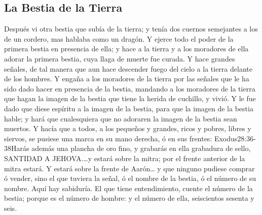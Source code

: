 \subsection*{La Bestia de la Tierra}
Después vi otra bestia que subía de la tierra; y tenía dos cuernos%
 semejantes a los de un cordero, mas hablaba como un dragón. 
Y ejerce todo el poder de la primera bestia en presencia de ella; y hace a la tierra y a los moradores de ella adorar la primera bestia, cuya llaga de muerte fue curada. 
Y hace grandes señales, de tal manera que aun hace descender fuego del cielo a la tierra delante de los hombres.%
Y engaña a los moradores de la tierra por las señales que le ha sido dado hacer en presencia de la bestia, mandando a los moradores de la tierra que hagan la imagen de la bestia que tiene la herida de cuchillo, y vivió. 
Y le fue dado que diese espíritu a la imagen de la bestia, para que la imagen de la bestia hable; y hará que cualesquiera que no adoraren la imagen de la bestia sean muertos.%
Y hacía que a todos, a los pequeños y grandes, ricos y pobres, libres y siervos, se pusiese una marca en su mano derecha, ó en sus frentes:%
				  {Exodus}{28:36-38}{Harás además una plancha de oro fino, y grabarás en ella grabadura de sello, SANTIDAD A JEHOVA.\ldots y estará sobre la mitra; por el frente anterior de la mitra estará. Y estará sobre la frente de Aarón\ldots}
y que ninguno pudiese comprar ó vender, sino el que tuviera la señal, ó el nombre de la bestia, ó el número de su nombre. 
Aquí hay sabiduría. El que tiene entendimiento, cuente el número de la bestia; porque es el número de hombre: y el número de ella, seiscientos sesenta y seis.
